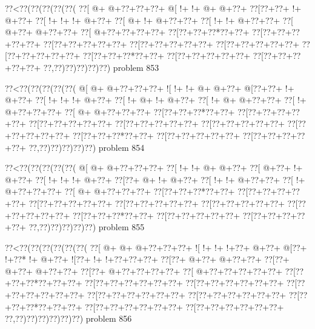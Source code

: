 \vbox{\vbox{\goo
\0??<\0??(\0??(\0??(\0??(\0??(
\0??[\- @+\- @+\0??+\0??+\0??+
\- @[\- !+\- !+\- @+\- @+\0??+
\0??[\0??+\0??+\- !+\- @+\0??+
\0??[\- !+\- !+\- !+\- @+\0??+
\0??[\- @+\- !+\- @+\0??+\0??+
\0??[\- !+\- !+\- @+\0??+\0??+
\0??[\- @+\0??+\- @+\0??+\0??+
\0??[\- @+\0??+\0??+\0??+\0??+
\0??[\0??+\0??+\0??*\0??+\0??+
\0??[\0??+\0??+\0??+\0??+\0??+
\0??[\0??+\0??+\0??+\0??+\0??+
\0??[\0??+\0??+\0??+\0??+\0??+
\0??[\0??+\0??+\0??+\0??+\0??+
\0??[\0??+\0??+\0??+\0??+\0??+
\0??[\0??+\0??+\0??*\0??+\0??+
\0??[\0??+\0??+\0??+\0??+\0??+
\0??[\0??+\0??+\0??+\0??+\0??+
\0??,\0??)\0??)\0??)\0??)\0??)
}
\hfil problem 853\hfil\break
}

\vbox{\vbox{\goo
\0??<\0??(\0??(\0??(\0??(\0??(
\- @[\- @+\- @+\0??+\0??+\0??+
\- ![\- !+\- !+\- @+\- @+\0??+
\- @[\0??+\0??+\- !+\- @+\0??+
\0??[\- !+\- !+\- !+\- @+\0??+
\0??[\- !+\- @+\- !+\- @+\0??+
\0??[\- !+\- @+\- @+\0??+\0??+
\0??[\- !+\- @+\0??+\0??+\0??+
\0??[\- @+\- @+\0??+\0??+\0??+
\0??[\0??+\0??+\0??*\0??+\0??+
\0??[\0??+\0??+\0??+\0??+\0??+
\0??[\0??+\0??+\0??+\0??+\0??+
\0??[\0??+\0??+\0??+\0??+\0??+
\0??[\0??+\0??+\0??+\0??+\0??+
\0??[\0??+\0??+\0??+\0??+\0??+
\0??[\0??+\0??+\0??*\0??+\0??+
\0??[\0??+\0??+\0??+\0??+\0??+
\0??[\0??+\0??+\0??+\0??+\0??+
\0??,\0??)\0??)\0??)\0??)\0??)
}
\hfil problem 854\hfil\break
}

\vbox{\vbox{\goo
\0??<\0??(\0??(\0??(\0??(\0??(
\- @[\- @+\- @+\0??+\0??+\0??+
\0??[\- !+\- !+\- @+\- @+\0??+
\0??[\- @+\0??+\- !+\- @+\0??+
\0??[\- !+\- !+\- !+\- @+\0??+
\0??[\0??+\- @+\- !+\- @+\0??+
\0??[\- !+\- !+\- @+\0??+\0??+
\0??[\- !+\- @+\0??+\0??+\0??+
\0??[\- @+\- @+\0??+\0??+\0??+
\0??[\0??+\0??+\0??*\0??+\0??+
\0??[\0??+\0??+\0??+\0??+\0??+
\0??[\0??+\0??+\0??+\0??+\0??+
\0??[\0??+\0??+\0??+\0??+\0??+
\0??[\0??+\0??+\0??+\0??+\0??+
\0??[\0??+\0??+\0??+\0??+\0??+
\0??[\0??+\0??+\0??*\0??+\0??+
\0??[\0??+\0??+\0??+\0??+\0??+
\0??[\0??+\0??+\0??+\0??+\0??+
\0??,\0??)\0??)\0??)\0??)\0??)
}
\hfil problem 855\hfil\break
}

\vbox{\vbox{\goo
\0??<\0??(\0??(\0??(\0??(\0??(\0??(
\0??[\- @+\- @+\- @+\0??+\0??+\0??+
\- ![\- !+\- !+\- !+\0??+\- @+\0??+
\- @[\0??+\- !+\0??*\- !+\- @+\0??+
\- ![\0??+\- !+\- !+\0??+\0??+\0??+
\0??[\0??+\- @+\0??+\- @+\0??+\0??+
\0??[\0??+\- @+\0??+\- @+\0??+\0??+
\0??[\0??+\- @+\0??+\0??+\0??+\0??+
\0??[\- @+\0??+\0??+\0??+\0??+\0??+
\0??[\0??+\0??+\0??*\0??+\0??+\0??+
\0??[\0??+\0??+\0??+\0??+\0??+\0??+
\0??[\0??+\0??+\0??+\0??+\0??+\0??+
\0??[\0??+\0??+\0??+\0??+\0??+\0??+
\0??[\0??+\0??+\0??+\0??+\0??+\0??+
\0??[\0??+\0??+\0??+\0??+\0??+\0??+
\0??[\0??+\0??+\0??*\0??+\0??+\0??+
\0??[\0??+\0??+\0??+\0??+\0??+\0??+
\0??[\0??+\0??+\0??+\0??+\0??+\0??+
\0??,\0??)\0??)\0??)\0??)\0??)\0??)
}
\hfil problem 856\hfil\break
}

